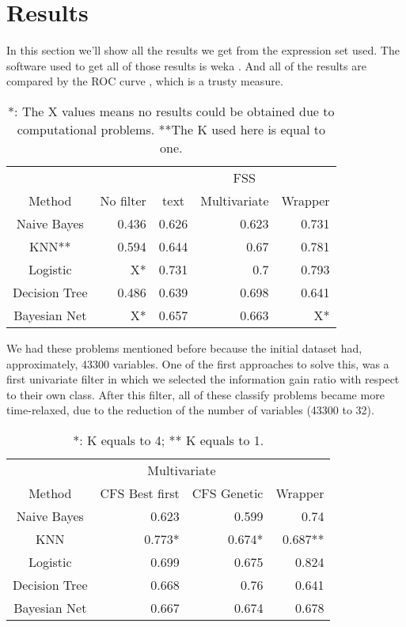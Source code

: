 \documentclass[conference,a4paper]{IEEEtran}
\begin{document}
\section{Results}


In this section we'll show all the results we get from the expression set used. The software used to get all of those results is weka \cite{weka}. And all of the results are compared by the ROC curve \cite{ROC}, which is a trusty measure.

\begin{table}[h]
\caption{*: The X values means no results could be obtained due to computational problems. **The K used here is equal to one.}
\centering
\begin{tabular}{c r r r r}
\hline\hline
 & & \multicolumn{3}{|c}{FSS} \\
Method & No filter & \multicolumn{1}{|c}{text}Univariate & Multivariate & Wrapper\\ [0.2ex]
\hline
Naive Bayes & 0.436 & 0.626 & 0.623 & 0.731 \\
KNN** & 0.594 & 0.644 & 0.67 & 0.781 \\
Logistic &  X* & 0.731 & 0.7 & 0.793\\
Decision Tree & 0.486 & 0.639 & 0.698 & 0.641\\
Bayesian Net & X* & 0.657 & 0.663 & X* \\ [1ex]
\hline
\end{tabular}
\label{table:basicsResults}
\end{table}

We had these problems mentioned before because the initial dataset had, approximately, 43300 variables. One of the first approaches to solve this, was a first univariate filter in which we selected the information gain ratio with respect to their own class. After this filter, all of these classify problems became more time-relaxed, due to the reduction of the number of variables (43300 to 32).

\begin{table}[h]
	\caption{*: K equals to 4; ** K equals to 1.}
	\centering
	\begin{tabular}{c r r r}
		\hline\hline
		& \multicolumn{2}{c}{Multivariate} & \\
		Method & CFS Best first & CFS Genetic & Wrapper\\ [0.2ex]
		\hline
		Naive Bayes & 0.623 & 0.599 & 0.74 \\
		KNN & 0.773* & 0.674* & 0.687** \\
		Logistic & 0.699 & 0.675 & 0.824 \\
		Decision Tree & 0.668 & 0.76 & 0.641 \\
		Bayesian Net & 0.667 & 0.674 & 0.678 \\ [1ex]
		\hline
	\end{tabular}
	\label{table:filteredResults}
\end{table}
\end{document}
